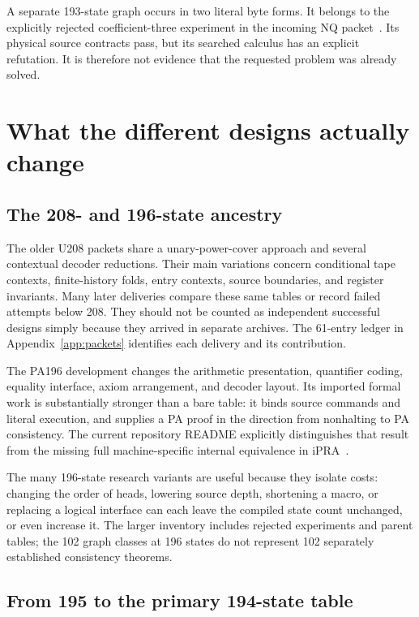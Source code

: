 \documentclass[11pt,letterpaper]{article}
\begin{document}
A separate 193-state graph occurs in two literal byte forms. It belongs
to the explicitly rejected coefficient-three experiment in the incoming
NQ packet~\cite{nq}. Its physical source contracts pass, but its searched
calculus has an explicit refutation. It is therefore not evidence that
the requested problem was already solved.

\section{What the different designs actually change}
\label{sec:families}

\subsection{The 208- and 196-state ancestry}

The older U208 packets share a unary-power-cover approach and several
contextual decoder reductions. Their main variations concern conditional
tape contexts, finite-history folds, entry contexts, source boundaries,
and register invariants. Many later deliveries compare these same tables
or record failed attempts below 208. They should not be counted as
independent successful designs simply because they arrived in separate
archives. The 61-entry ledger in Appendix~\ref{app:packets} identifies
each delivery and its contribution.

The PA196 development changes the arithmetic presentation, quantifier
coding, equality interface, axiom arrangement, and decoder layout. Its
imported formal work is substantially stronger than a bare table: it binds
source commands and literal execution, and supplies a PA proof in the
direction from nonhalting to PA consistency. The current repository
README explicitly distinguishes that result from the missing full
machine-specific internal equivalence in iPRA~\cite{status}.

The many 196-state research variants are useful because they isolate costs:
changing the order of heads, lowering source depth, shortening a macro,
or replacing a logical interface can each leave the compiled state count
unchanged, or even increase it. The larger inventory includes rejected
experiments and parent tables; the 102 graph classes at 196 states do not
represent 102 separately established consistency theorems.

\subsection{From 195 to the primary 194-state table}
\end{document}
